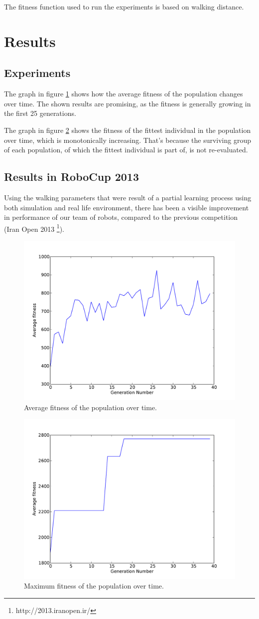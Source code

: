 \documentclass[a4paper, twocolumn]{article}
\begin{document}
The fitness function used to run the experiments is based on walking distance. 

\section{Results}

\subsection{Experiments}
The graph in figure \ref{fig:avg} shows how the average fitness of the population changes over time. The shown results are promising, as the fitness is generally growing in the first 25 generations. 

The graph in figure \ref{fig:max} shows the fitness of the fittest individual in the population over time, which is monotonically increasing. That's because the surviving group of each population, of which the fittest individual is part of, is not re-evaluated. 

\subsection{Results in RoboCup 2013}
Using the walking parameters that were result of a partial learning process using both simulation and real life environment, there has been a visible improvement in performance of our team of robots, compared to the previous competition (Iran Open 2013  \footnote{http://2013.iranopen.ir/}). 

\begin{figure}
	\center
	\includegraphics[width=.5\textwidth]{images/fitness}
	\caption{Average fitness of the population over time.}
	\label{fig:avg}
\end{figure}

\begin{figure}
	\center
	\includegraphics[width=.5\textwidth]{images/max_fitness}
	\caption{Maximum fitness of the population over time.}
	\label{fig:max}
\end{figure}
\end{document}

